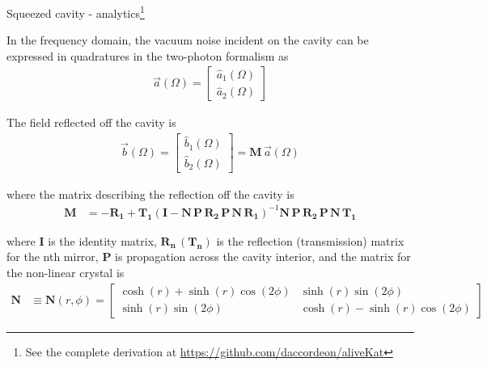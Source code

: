 \documentclass[12pt]{beamer}
\begin{document}
\begin{frame}{Squeezed cavity - analytics\footnote{\tiny See the complete derivation at {\color{blue}\url{https://github.com/daccordeon/aliveKat}}}
}

{\tiny
In the frequency domain, the vacuum noise incident on the cavity can be expressed in quadratures in the two-photon formalism as
\begin{align}
\vec{a}(\Omega) = \begin{bmatrix}
    \hat{a}_1(\Omega) \\
    \hat{a}_2(\Omega)
\end{bmatrix}
\end{align}

The field reflected off the cavity is
\begin{align}
\vec{b}(\Omega) = \begin{bmatrix}
    \hat{b}_1(\Omega) \\
    \hat{b}_2(\Omega)
\end{bmatrix} = \mathbf{M}\, \vec{a}(\Omega)
\end{align}

where the matrix describing the reflection off the cavity is
\begin{align}
\mathbf{M} &= -\mathbf{R_1} + \mathbf{T_1} ( \mathbf{I} - \mathbf{N}\, \mathbf{P}\, \mathbf{R_2}\, \mathbf{P}\, \mathbf{N}\, \mathbf{R_1} )^{-1} \mathbf{N}\, \mathbf{P}\, \mathbf{R_2}\, \mathbf{P}\, \mathbf{N}\, \mathbf{T_1} %
\end{align}

where $\mathbf{I}$ is the identity matrix, $\mathbf{R_n}\, (\mathbf{T_n})$ is the reflection (transmission) matrix for the nth mirror, $\mathbf{P}$ is propagation across the cavity interior, and the matrix for the non-linear crystal is
\begin{align}
\mathbf{N} &\equiv \mathbf{N}(r, \phi) = \begin{bmatrix} \cosh(r) + \sinh(r) \cos(2\phi) & \sinh(r) \sin(2\phi) \\ 
                                            \sinh(r) \sin(2\phi) & \cosh(r) - \sinh(r) \cos(2\phi)
                                            \end{bmatrix}
\end{align}

}
\end{frame}
\end{document}
